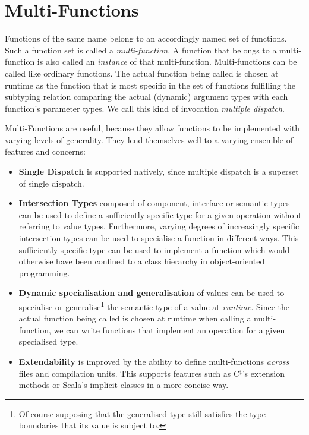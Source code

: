\chapter{Multi-Functions}

Functions of the same name belong to an accordingly named set of functions. Such a function set is called a \textit{multi-function}. A function that belongs to a multi-function is also called an \textit{instance} of that multi-function. Multi-functions can be called like ordinary functions. The actual function being called is chosen at runtime as the function that is most specific in the set of functions fulfilling the subtyping relation comparing the actual (dynamic) argument types with each function's parameter types. We call this kind of invocation \textit{multiple dispatch}. 

Multi-Functions are useful, because they allow functions to be implemented with varying levels of generality. They lend themselves well to a varying ensemble of features and concerns:
\begin{itemize}
	\item \textbf{Single Dispatch} is supported natively, since multiple dispatch is a superset of single dispatch.
	\item \textbf{Intersection Types} composed of component, interface or semantic types can be used to define a sufficiently specific type for a given operation without referring to value types. Furthermore, varying degrees of increasingly specific intersection types can be used to specialise a function in different ways. This sufficiently specific type can be used to implement a function which would otherwise have been confined to a class hierarchy in object-oriented programming.
	\item \textbf{Dynamic specialisation and generalisation} of values can be used to specialise or generalise\footnote{Of course supposing that the generalised type still satisfies the type boundaries that its value is subject to.} the semantic type of a value at \textit{runtime}. Since the actual function being called is chosen at runtime when calling a multi-function, we can write functions that implement an operation for a given specialised type.
	\item \textbf{Extendability} is improved by the ability to define multi-functions \textit{across} files and compilation units. This supports features such as C$^\sharp$'s extension methods or Scala's implicit classes in a more concise way.
\end{itemize}

